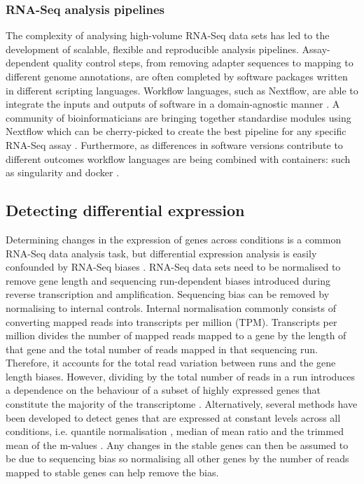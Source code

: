 \documentclass[../main.tex]{subfiles}
\begin{document}
\subsubsection{RNA-Seq analysis pipelines}

The complexity of analysing high-volume RNA-Seq data sets has led to the development of scalable, flexible and reproducible analysis pipelines.
Assay-dependent quality control steps, from removing adapter sequences to mapping to different genome annotations, are often completed by software packages written in different scripting languages.
Workflow languages, such as Nextflow, are able to integrate the inputs and outputs of software in a domain-agnostic manner \parencite{DiTommaso2017}.
A community of bioinformaticians are bringing together standardise modules using Nextflow which can be cherry-picked to create the best pipeline for any specific RNA-Seq assay \parencite{Ewels2020}.
Furthermore, as differences in software versions contribute to different outcomes workflow languages are being combined with containers: such as singularity and docker \parencite{DiTommaso2015}.

\subsection{Detecting differential expression}

Determining changes in the expression of genes across conditions is a common RNA-Seq data  analysis task, but differential expression analysis is easily confounded by RNA-Seq biases \parencite{Soneson2018}.
RNA-Seq data sets need to be normalised to remove gene length and sequencing run-dependent biases introduced during reverse transcription and amplification. 
Sequencing bias can be removed by normalising to internal controls. 
Internal normalisation commonly consists of converting mapped reads into transcripts per million (TPM).
Transcripts per million divides the number of mapped reads mapped to a gene by the length of that gene and the total number of reads mapped in that sequencing run.
Therefore, it accounts for the total read variation between runs and the gene length biases. 
However, dividing by the total number of reads in a run introduces a dependence on the behaviour of a subset of highly expressed genes that constitute the majority of the transcriptome \parencite{Zhao2020}.
Alternatively, several methods have been developed to detect genes that are expressed at constant levels across all conditions, i.e. quantile normalisation \parencite{Evans2018}, median of mean ratio \parencite{Anders2010} and the trimmed mean of the m-values \parencite{Robinson2010}. 
Any changes in the stable genes can then be assumed to be due to sequencing bias so normalising all other genes by the number of reads mapped to stable genes can help remove the bias.
\end{document}
